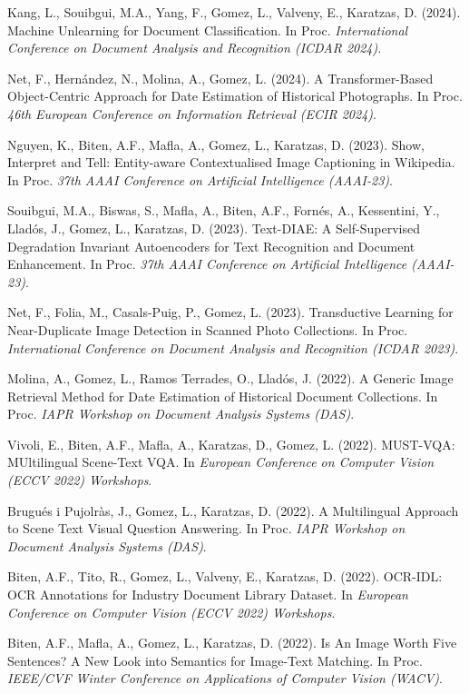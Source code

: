 \documentclass[11pt]{article}
\newcommand{\venue}[1]{\textit{#1}}
\begin{document}
\begin{pubs}
\item Kang, L., Souibgui, M.A., Yang, F., Gomez, L., Valveny, E., Karatzas, D. (2024). Machine Unlearning for Document Classification. In Proc. \venue{International Conference on Document Analysis and Recognition (ICDAR 2024)}.
\item Net, F., Hernández, N., Molina, A., Gomez, L. (2024). A Transformer-Based Object-Centric Approach for Date Estimation of Historical Photographs. In Proc. \venue{46th European Conference on Information Retrieval (ECIR 2024)}.
\item Nguyen, K., Biten, A.F., Mafla, A., Gomez, L., Karatzas, D. (2023). Show, Interpret and Tell: Entity-aware Contextualised Image Captioning in Wikipedia. In Proc. \venue{37th AAAI Conference on Artificial Intelligence (AAAI-23)}.
\item Souibgui, M.A., Biswas, S., Mafla, A., Biten, A.F., Fornés, A., Kessentini, Y., Lladós, J., Gomez, L., Karatzas, D. (2023). Text-DIAE: A Self-Supervised Degradation Invariant Autoencoders for Text Recognition and Document Enhancement. In Proc. \venue{37th AAAI Conference on Artificial Intelligence (AAAI-23)}.
\item Net, F., Folia, M., Casals-Puig, P., Gomez, L. (2023). Transductive Learning for Near-Duplicate Image Detection in Scanned Photo Collections. In Proc. \venue{International Conference on Document Analysis and Recognition (ICDAR 2023)}.
\item Molina, A., Gomez, L., Ramos Terrades, O., Lladós, J. (2022). A Generic Image Retrieval Method for Date Estimation of Historical Document Collections. In Proc. \venue{IAPR Workshop on Document Analysis Systems (DAS)}.
\item Vivoli, E., Biten, A.F., Mafla, A., Karatzas, D., Gomez, L. (2022). MUST-VQA: MUltilingual Scene-Text VQA. In \venue{European Conference on Computer Vision (ECCV 2022) Workshops}.
\item Brugués i Pujolràs, J., Gomez, L., Karatzas, D. (2022). A Multilingual Approach to Scene Text Visual Question Answering. In Proc. \venue{IAPR Workshop on Document Analysis Systems (DAS)}.
\item Biten, A.F., Tito, R., Gomez, L., Valveny, E., Karatzas, D. (2022). OCR-IDL: OCR Annotations for Industry Document Library Dataset. In \venue{European Conference on Computer Vision (ECCV 2022) Workshops}.
\item Biten, A.F., Mafla, A., Gomez, L., Karatzas, D. (2022). Is An Image Worth Five Sentences? A New Look into Semantics for Image-Text Matching. In Proc. \venue{IEEE/CVF Winter Conference on Applications of Computer Vision (WACV)}.

\end{pubs}
\end{document}
